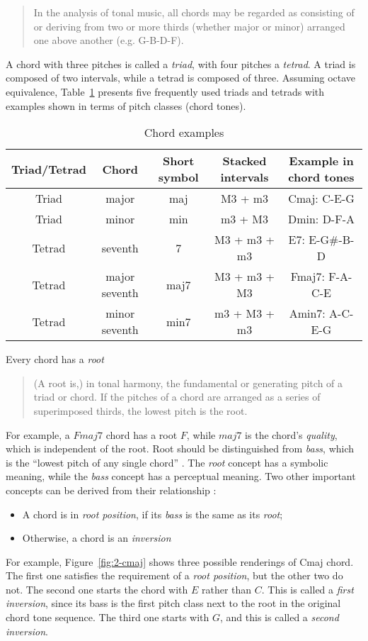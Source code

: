 \begin{quote}
In the analysis of tonal music, all chords may be regarded as consisting of or deriving from two or more thirds (whether major or minor) arranged one above another (e.g. G-B-D-F).
\end{quote}

A chord with three pitches is called a {\it triad}, with four pitches a {\it tetrad}. A triad is composed of two intervals, while a tetrad is composed of three. Assuming octave equivalence, Table~\ref{tab:2-chords} presents five frequently used triads and tetrads with examples shown in terms of pitch classes (chord tones).
\begin{table}
\caption{Chord examples}
\centering
\scriptsize
\begin{tabular}{|c|c|c|c|c|} \hline
Triad/Tetrad & Chord & Short symbol & Stacked intervals & Example in chord tones \\ \hline
Triad & major & maj & M3 + m3 & Cmaj: C-E-G \\ \hline
Triad & minor & min & m3 + M3 & Dmin: D-F-A \\ \hline
Tetrad  & seventh & 7 & M3 + m3 + m3 & E7: E-G\#-B-D \\ \hline
Tetrad & major seventh & maj7 & M3 + m3 + M3 & Fmaj7: F-A-C-E \\ \hline
Tetrad & minor seventh & min7 & m3 + M3 + m3 & Amin7: A-C-E-G \\ \hline
\end{tabular}
\label{tab:2-chords}
\end{table}
Every chord has a {\it root} \cite{randel1999harvard}
\begin{quote}
(A root is,) in tonal harmony, the fundamental or generating pitch of a triad or chord. If the pitches of a chord are arranged as a series of superimposed thirds, the lowest pitch is the root.
\end{quote}
For example, a $Fmaj7$ chord has a root $F$, while $maj7$ is the chord's {\it quality}, which is independent of the root. Root should be distinguished from {\it bass}, which is the ``lowest pitch of any single chord'' \cite{randel1999harvard}. The {\it root} concept has a symbolic meaning, while the {\it bass} concept has a perceptual meaning. Two other important concepts can be derived from their relationship \cite{randel1999harvard}:
\begin{itemize}
\item A chord is in {\it root position}, if its {\it bass} is the same as its {\it root};
\item Otherwise, a chord is an {\it inversion}
\end{itemize}
For example, Figure~\ref{fig:2-cmaj} shows three possible renderings of Cmaj chord. The first one satisfies the requirement of a {\it root position}, but the other two do not. The second one starts the chord with $E$ rather than $C$. This is called a {\it first inversion}, since its bass is the first pitch class next to the root in the original chord tone sequence. The third one starts with $G$, and this is called a {\it second inversion}.

